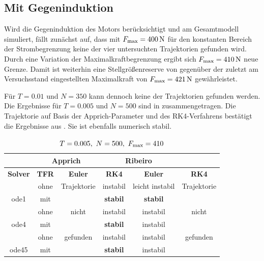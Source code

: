 \subsection{Mit Gegeninduktion}

Wird die Gegeninduktion des Motors berücksichtigt und am Gesamtmodell simuliert, fällt zunächst auf, dass mit $F_{\mathrm{max}}= 400\,\mathrm{N}$ für den konstanten Bereich der Strombegrenzung keine der vier untersuchten Trajektorien gefunden wird. Durch eine Variation der Maximalkraftbegrenzung ergibt sich $F_{\mathrm{max}}= 410\,\mathrm{N}$ neue Grenze. Damit ist weiterhin eine Stellgrößenreserve von  gegenüber der zuletzt am Versuchsstand eingestellten Maximalkraft von $F_{\mathrm{max}}= 421\,\mathrm{N}$ gewährleistet. 

Für $T=0.01$ und $N=350$ kann dennoch keine der Trajektorien gefunden werden. Die Ergebnisse für $T=0.005$ und $N=500$ sind in  zusammengetragen. Die Trajektorie auf Basis der Apprich-Parameter und des RK4-Verfahrens bestätigt die Ergebnisse aus . Sie ist ebenfalls numerisch stabil.

\begin{table}[htbp]
	\centering
	\caption{$T=0.005, \ N=500, \ F_{\mrm{max}}=410$}
		\begin{tabular}{c|c|c|c|c|c}
			\rowcolor[gray]{0.9}
			\multicolumn{2}{c|}{\textbf{Simulation}} & \multicolumn{2}{c|}{\textbf{Apprich}} & \multicolumn{2}{c}{\textbf{Ribeiro}} \\
			\midrule
			\rowcolor[gray]{0.9}
			\textbf{Solver} & \textbf{TFR} & \textbf{Euler} & \textbf{RK4} & \textbf{Euler} & \textbf{RK4} \\
			\midrule
			\cellcolor[gray]{0.9}  											& \cellcolor[gray]{.9}ohne & Trajektorie  & instabil & leicht instabil & Trajektorie\\
			\multirow{-2}{*}{\cellcolor[gray]{.9}ode1}	& \cellcolor[gray]{.9}mit  &   						& \textbf{stabil} & \textbf{stabil} 				 & 	\\
			\midrule		
			\cellcolor[gray]{0.9}  											& \cellcolor[gray]{.9}ohne & nicht	& instabil 						& instabil & nicht\\
			\multirow{-2}{*}{\cellcolor[gray]{.9}ode4}	& \cellcolor[gray]{.9}mit  &        & \textbf{stabil}   	& instabil & \\
			\midrule	
			\cellcolor[gray]{0.9}  											& \cellcolor[gray]{.9}ohne & gefunden 	&  instabil    			& instabil 	& gefunden\\
			\multirow{-2}{*}{\cellcolor[gray]{.9}ode45}	& \cellcolor[gray]{.9}mit  &  					&  \textbf{stabil}  & instabil 	& \\																											
		\end{tabular}
	\label{tab:T001N350Fmax400}
\end{table}

